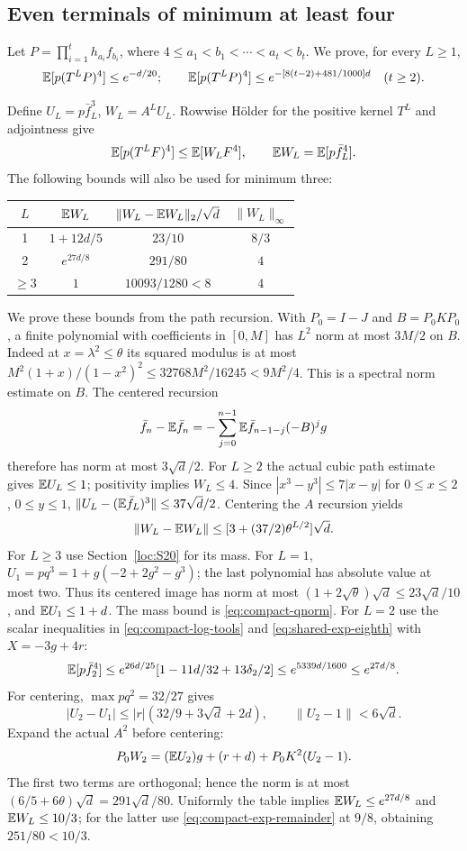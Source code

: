 \subsection{Even terminals of minimum at least four}\label{loc:S27}
Let $P=\prod_{i=1}^th_{a_i}f_{b_i}$, where
$4\le a_1<b_1<\cdots<a_t<b_t$. We prove, for every $L\ge1$,
\[
 \mathbb E[p(T^LP)^4]\le e^{-d/20};\qquad
 \mathbb E[p(T^LP)^4]\le e^{-[8(t-2)+481/1000]d}\quad(t\ge2).
\]

Define $U_L=p\bar f_{L}^3$, $W_L=A^LU_L$.
Rowwise H\"older for the positive kernel $T^L$ and adjointness give
\begin{equation}\label{eq:compact-reference-weight}
 \mathbb E[p(T^LF)^4]\le\mathbb E[W_LF^4],\qquad \mathbb E W_L=\mathbb E[p\bar f_{L}^4].
\end{equation}
The following bounds will also be used for minimum three:
\begin{center}
\begin{tabular}{@{}cccc@{}}
\toprule
$L$ & $\mathbb E W_L$ & $\|W_L-\mathbb E W_L\|_2/\sqrt d$ & $\|W_L\|_\infty$\\\midrule
1 & $1+12d/5$ & $23/10$ & $8/3$\\
2 & $e^{27d/8}$ & $291/80$ & $4$\\
$\ge3$ & $1$ & $10093/1280<8$ & $4$\\\bottomrule
\end{tabular}
\end{center}
We prove these bounds from the path recursion.
With $P_0=I-J$ and $B=P_0KP_0$, a finite polynomial with coefficients
in $[0,M]$ has $L^2$ norm at most $3M/2$ on $B$.
Indeed at $x=\lambda^2\le\theta$ its squared modulus is at most
$M^2(1+x)/(1-x^2)^2\le32768M^2/16245<9M^2/4$.
This is a spectral norm estimate on $B$.
The centered recursion
\[
 \bar f_{n}-\mathbb E \bar f_{n}=-\sum_{j=0}^{n-1}\mathbb E \bar f_{n-1-j}(-B)^jg
\]
therefore has norm at most $3\sqrt d/2$.
For $L\ge2$ the actual cubic path estimate gives $\mathbb E U_L\le1$;
positivity implies $W_L\le4$.
Since $|x^3-y^3|\le7|x-y|$ for $0\le x\le2$, $0\le y\le1$,
$\|U_L-(\mathbb E \bar f_{L})^3\|\le37\sqrt d/2$.
Centering the $A$ recursion yields
\[
 \|W_L-\mathbb E W_L\|\le[3+(37/2)\theta^{L/2}]\sqrt d.
\]
For $L\ge3$ use Section~\ref{loc:S20} for its mass.
For $L=1$, $U_1=pq^3=1+g(-2+2g^2-g^3)$;
the last polynomial has absolute value at most two.
Thus its centered image has norm at most
$(1+2\sqrt\theta)\sqrt d\le23\sqrt d/10$, and $\mathbb E U_1\le1+d$.
The mass bound is \eqref{eq:compact-qnorm}.
For $L=2$ use the scalar inequalities in
\eqref{eq:compact-log-tools} and \eqref{eq:shared-exp-eighth} with $X=-3g+4r$:
\[
 \mathbb E[p\bar f_2^4]\le e^{26d/25}[1-11d/32+13\delta_{2}/2]
                \le e^{5339d/1600}\le e^{27d/8}.
\]
For centering, $\max pq^2=32/27$ gives
\[
 |U_2-U_1|\le |r|(32/9+3\sqrt d+2d),\qquad
 \|U_2-1\|<6\sqrt d.
\]
Expand the actual $A^2$ before centering:
\[
 P_0W_2=(\mathbb E U_2)g+(r+d)+P_0K^2(U_2-1).
\]
The first two terms are orthogonal; hence the norm is at most
$(6/5+6\theta)\sqrt d=291\sqrt d/80$.
Uniformly the table implies $\mathbb E W_L\le e^{27d/8}$ and
$\mathbb E W_L\le10/3$; for the latter use
\eqref{eq:compact-exp-remainder} at $9/8$, obtaining $251/80<10/3$.

